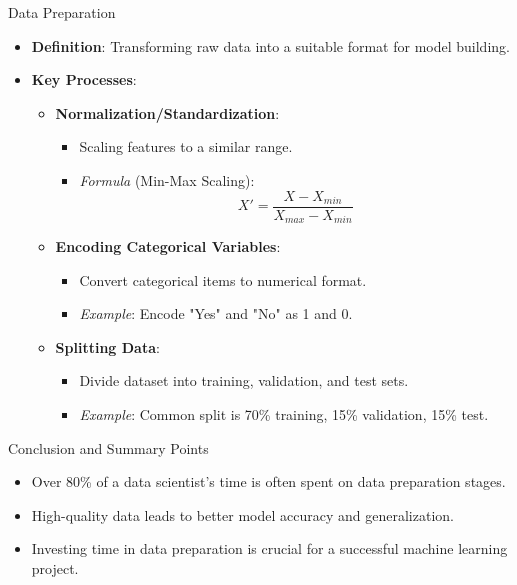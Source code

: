 \documentclass[aspectratio=169]{beamer}
\begin{document}
\begin{frame}[fragile]{Data Preparation}
    \begin{itemize}
        \item \textbf{Definition}: Transforming raw data into a suitable format for model building.
        \item \textbf{Key Processes}:
            \begin{itemize}
                \item \textbf{Normalization/Standardization}:
                    \begin{itemize}
                        \item Scaling features to a similar range.
                        \item \textit{Formula} (Min-Max Scaling):
                        \begin{equation}
                        X' = \frac{X - X_{min}}{X_{max} - X_{min}}
                        \end{equation}
                    \end{itemize}
                \item \textbf{Encoding Categorical Variables}:
                    \begin{itemize}
                        \item Convert categorical items to numerical format.
                        \item \textit{Example}: Encode "Yes" and "No" as 1 and 0.
                    \end{itemize}
                \item \textbf{Splitting Data}:
                    \begin{itemize}
                        \item Divide dataset into training, validation, and test sets.
                        \item \textit{Example}: Common split is 70\% training, 15\% validation, 15\% test.
                    \end{itemize}
            \end{itemize}
    \end{itemize}
\end{frame}

\begin{frame}[fragile]{Conclusion and Summary Points}
    \begin{itemize}
        \item Over 80\% of a data scientist's time is often spent on data preparation stages.
        \item High-quality data leads to better model accuracy and generalization.
        \item Investing time in data preparation is crucial for a successful machine learning project.
    \end{itemize}
\end{frame}
\end{document}
